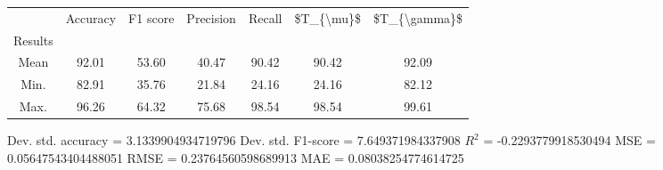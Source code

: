 \begin{tabular}{|c|c|c|c|c|c|c|}
\toprule
{} &  Accuracy &  F1 score &  Precision &  Recall &  \$T\_\{\textbackslash mu\}\$ &  \$T\_\{\textbackslash gamma\}\$ \\
Results &           &           &            &         &            &               \\
\hline
Mean    &     92.01 &     53.60 &      40.47 &   90.42 &      90.42 &         92.09 \\
Min.    &     82.91 &     35.76 &      21.84 &   24.16 &      24.16 &         82.12 \\
Max.    &     96.26 &     64.32 &      75.68 &   98.54 &      98.54 &         99.61 \\
\bottomrule
\end{tabular}

 Dev. std. accuracy = 3.1339904934719796
 Dev. std. F1-score = 7.649371984337908
 $R^2$ = -0.2293779918530494
 MSE = 0.05647543404488051
 RMSE = 0.23764560598689913
 MAE = 0.08038254774614725